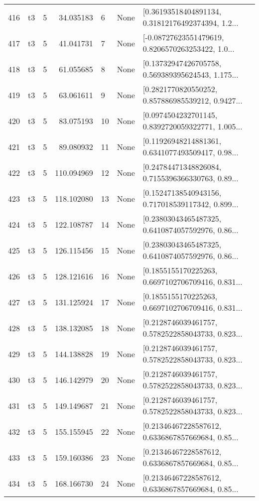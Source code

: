 \begin{tabular}{lllrlll}
416 &  t3 &   5 &   34.035183 &    6 &  None &  [0.36193518404891134, 0.31812176492374394, 1.2... \\
417 &  t3 &   5 &   41.041731 &    7 &  None &  [-0.08727623551479619, 0.8206570263253422, 1.0... \\
418 &  t3 &   5 &   61.055685 &    8 &  None &  [0.13732947426705758, 0.569389395624543, 1.175... \\
419 &  t3 &   5 &   63.061611 &    9 &  None &  [0.2821770820550252, 0.857886985539212, 0.9427... \\
420 &  t3 &   5 &   83.075193 &   10 &  None &  [0.0974504232701145, 0.8392720059322771, 1.005... \\
421 &  t3 &   5 &   89.080932 &   11 &  None &  [0.11926948214881361, 0.6341077493509417, 0.98... \\
422 &  t3 &   5 &  110.094969 &   12 &  None &  [0.24784471348826084, 0.7155396366330763, 0.89... \\
423 &  t3 &   5 &  118.102080 &   13 &  None &  [0.15247138540943156, 0.717018539117342, 0.899... \\
424 &  t3 &   5 &  122.108787 &   14 &  None &  [0.23803043465487325, 0.6410874057592976, 0.86... \\
425 &  t3 &   5 &  126.115456 &   15 &  None &  [0.23803043465487325, 0.6410874057592976, 0.86... \\
426 &  t3 &   5 &  128.121616 &   16 &  None &  [0.1855155170225263, 0.6697102706709416, 0.831... \\
427 &  t3 &   5 &  131.125924 &   17 &  None &  [0.1855155170225263, 0.6697102706709416, 0.831... \\
428 &  t3 &   5 &  138.132085 &   18 &  None &  [0.2128746039461757, 0.5782522858043733, 0.823... \\
429 &  t3 &   5 &  144.138828 &   19 &  None &  [0.2128746039461757, 0.5782522858043733, 0.823... \\
430 &  t3 &   5 &  146.142979 &   20 &  None &  [0.2128746039461757, 0.5782522858043733, 0.823... \\
431 &  t3 &   5 &  149.149687 &   21 &  None &  [0.2128746039461757, 0.5782522858043733, 0.823... \\
432 &  t3 &   5 &  155.155945 &   22 &  None &  [0.21346467228587612, 0.6336867857669684, 0.85... \\
433 &  t3 &   5 &  159.160386 &   23 &  None &  [0.21346467228587612, 0.6336867857669684, 0.85... \\
434 &  t3 &   5 &  168.166730 &   24 &  None &  [0.21346467228587612, 0.6336867857669684, 0.85... \\

\end{tabular}
